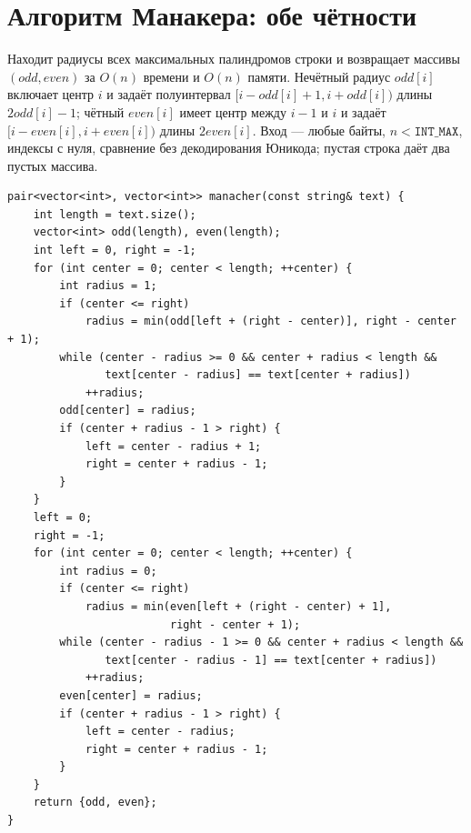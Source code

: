 \section{Алгоритм Манакера: обе чётности}
Находит радиусы всех максимальных палиндромов строки и возвращает массивы $(odd,even)$ за $O(n)$ времени и $O(n)$ памяти.
Нечётный радиус $odd[i]$ включает центр $i$ и задаёт полуинтервал $[i-odd[i]+1,i+odd[i])$ длины $2odd[i]-1$; чётный $even[i]$ имеет центр между $i-1$ и $i$ и задаёт $[i-even[i],i+even[i])$ длины $2even[i]$.
Вход --- любые байты, $n<\texttt{INT\_MAX}$, индексы с нуля, сравнение без декодирования Юникода; пустая строка даёт два пустых массива.
\begin{lstlisting}[name=str_manacher]
pair<vector<int>, vector<int>> manacher(const string& text) {
    int length = text.size();
    vector<int> odd(length), even(length);
    int left = 0, right = -1;
    for (int center = 0; center < length; ++center) {
        int radius = 1;
        if (center <= right)
            radius = min(odd[left + (right - center)], right - center + 1);
        while (center - radius >= 0 && center + radius < length &&
               text[center - radius] == text[center + radius])
            ++radius;
        odd[center] = radius;
        if (center + radius - 1 > right) {
            left = center - radius + 1;
            right = center + radius - 1;
        }
    }
    left = 0;
    right = -1;
    for (int center = 0; center < length; ++center) {
        int radius = 0;
        if (center <= right)
            radius = min(even[left + (right - center) + 1],
                         right - center + 1);
        while (center - radius - 1 >= 0 && center + radius < length &&
               text[center - radius - 1] == text[center + radius])
            ++radius;
        even[center] = radius;
        if (center + radius - 1 > right) {
            left = center - radius;
            right = center + radius - 1;
        }
    }
    return {odd, even};
}
\end{lstlisting}
